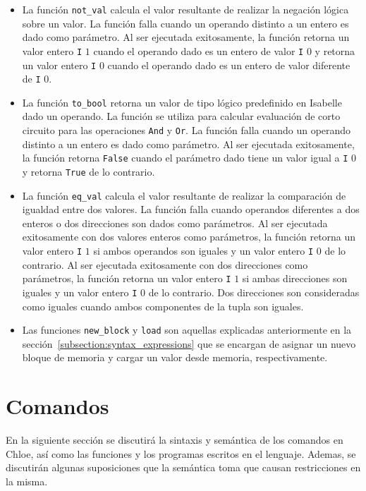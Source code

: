 \begin{itemize}
\item{La función \verb|not_val| calcula el valor resultante de realizar la negación lógica sobre un valor.
La función falla cuando un operando distinto a un entero es dado como parámetro.
Al ser ejecutada exitosamente, la función retorna un valor entero \verb|I| $1$ cuando el operando dado es un entero de valor \verb|I| $0$ y retorna un valor entero \verb|I| $0$ cuando el operando dado es un entero de valor diferente de \verb|I| $0$.}

\item{La función \verb|to_bool| retorna un valor de tipo lógico predefinido en Isabelle dado un operando.
La función se utiliza para calcular evaluación de corto circuito para las operaciones \verb|And| y \verb|Or|.
La función falla cuando un operando distinto a un entero es dado como parámetro.
Al ser ejecutada exitosamente, la función retorna \verb|False| cuando el parámetro dado tiene un valor igual a \verb|I| $0$ y retorna \verb|True| de lo contrario.}

\item{La función \verb|eq_val| calcula el valor resultante de realizar la comparación de igualdad entre dos valores.
La función falla cuando operandos diferentes a dos enteros o dos direcciones son dados como parámetros.
Al ser ejecutada exitosamente con dos valores enteros como parámetros, la función retorna un valor entero \verb|I| $1$ si ambos operandos son iguales y un valor entero \verb|I| $0$ de lo contrario.
Al ser ejecutada exitosamente con dos direcciones como parámetros, la función retorna un valor entero \verb|I| $1$ si ambas direcciones son iguales y un valor entero \verb|I| $0$ de lo contrario.
Dos direcciones son consideradas como iguales cuando ambos componentes de la tupla son iguales.}

\item{Las funciones \verb|new_block| y \verb|load| son aquellas explicadas anteriormente en la sección~\ref{subsection:syntax_expressions} que se encargan de asignar un nuevo bloque de memoria y cargar un valor desde memoria, respectivamente.}
\end{itemize}


\section{Comandos}\label{section:commands}

En la siguiente sección se discutirá la sintaxis y semántica de los comandos en Chloe, así como las funciones y los programas escritos en el lenguaje.
Ademas, se discutirán algunas suposiciones que la semántica toma que causan restricciones en la misma.

